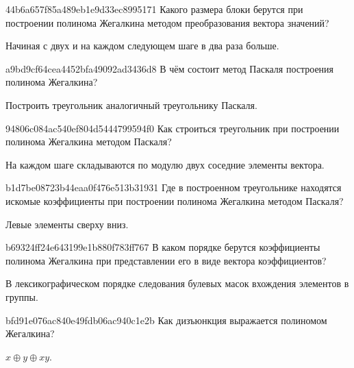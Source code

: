 \begin{note}{44b6a657f85a489eb1e9d33ec8995171}
    Какого размера блоки берутся при построении полинома Жегалкина методом преобразования вектора значений?

    \begin{cloze}{1}
        Начиная с двух и на каждом следующем шаге в два раза больше.
    \end{cloze}
\end{note}

\begin{note}{a9bd9cf64cea4452bfa49092ad3436d8}
    В чём состоит метод Паскаля построения полинома Жегалкина?

    \begin{cloze}{1}
        Построить треугольник аналогичный треугольнику Паскаля.
    \end{cloze}
\end{note}

\begin{note}{94806c084ac540ef804d5444799594f0}
    Как строиться треугольник при построении полинома Жегалкина методом Паскаля?

    \begin{cloze}{1}
        На каждом шаге складываются по модулю двух соседние элементы вектора.
    \end{cloze}
\end{note}

\begin{note}{b1d7be08723b44eaa0f476e513b31931}
    Где в построенном треугольнике находятся искомые коэффициенты при построении полинома Жегалкина методом Паскаля?

    \begin{cloze}{1}
        Левые элементы сверху вниз.
    \end{cloze}
\end{note}

\begin{note}{b69324ff24e643199e1b880f783ff767}
    В каком порядке берутся коэффициенты полинома Жегалкина при представлении его в виде вектора коэффициентов?

    \begin{cloze}{1}
        В лексикографическом порядке следования булевых масок вхождения элементов в группы.
    \end{cloze}
\end{note}

\begin{note}{bfd91e076ac840e49fdb06ac940c1e2b}
    Как дизъюнкция выражается полиномом Жегалкина?

    \begin{cloze}{1}
        \({ x \oplus y \oplus xy }\).
    \end{cloze}
\end{note}

